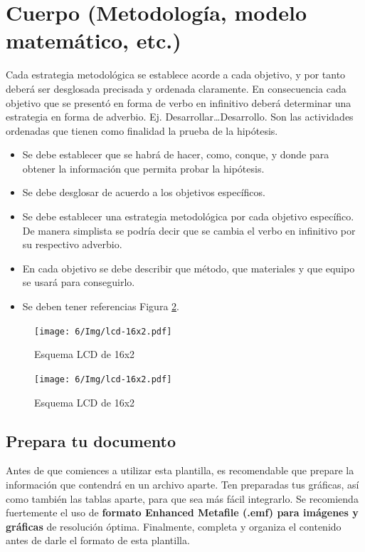     \section{Cuerpo (Metodología, modelo matemático, etc.)}
    
    Cada estrategia metodológica se establece acorde a cada objetivo, y por tanto deberá ser desglosada precisada y ordenada claramente. En consecuencia cada objetivo que se presentó en forma de verbo en infinitivo deberá determinar una estrategia en forma de adverbio. Ej. Desarrollar…Desarrollo. Son las actividades ordenadas que tienen como finalidad la prueba de la hipótesis. 
    
    \begin{itemize}
        \item Se debe establecer que se habrá de hacer, como, conque, y donde para obtener la información que permita probar la hipótesis.  
        \item Se debe desglosar de acuerdo a los objetivos específicos. 
        \item Se debe establecer una estrategia metodológica por cada objetivo específico. De manera simplista se podría decir que se cambia el verbo en infinitivo por su respectivo adverbio.
        \item En cada objetivo se debe describir que método, que materiales y que equipo se usará para conseguirlo.
        \item Se deben tener referencias Figura \ref{fig:lcd-16x2}.
    \end{itemize}
    \begin{figure}[H]
        \centering
        \texttt{[image: 6/Img/lcd-16x2.pdf]}
        \caption{Esquema LCD de 16x2}
        \label{fig:lcd-16x2}
    \end{figure}
    \begin{figure}[H]
        \centering
        \texttt{[image: 6/Img/lcd-16x2.pdf]}
        \caption{Esquema LCD de 16x2}
        \label{fig:lcd-16x2}
    \end{figure}
    \subsection{Prepara tu documento}
    
    Antes de que comiences a utilizar esta plantilla, es recomendable que prepare la información que contendrá en un archivo aparte. 
    Ten preparadas tus gráficas, así como también las tablas aparte, para que sea más fácil integrarlo. 
    Se recomienda fuertemente el uso de \textbf{formato Enhanced Metafile (.emf) para imágenes y gráficas} de resolución óptima. 
    Finalmente, completa y organiza el contenido antes de darle el formato de esta plantilla. 
    
